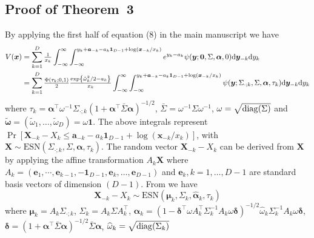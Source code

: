 \documentclass[lineno]{biometrika}
\begin{document}
\subsection{Proof of Theorem~3}

By applying the first half of equation (8) in the main manuscript we have
\begin{align}
\label{eq:V_skBR1}
V(\bm x) &= 
\sum_{k=1}^D {\textstyle{1\over x_k}} \int_{-\infty}^\infty \int_{-\infty}^{y_k+\bm a_{-k}-a_k\bm 1_{D-1}+\log(\bm x_{-k}/x_k)} e^{y_k-a_k} \psi(\bm y;\bm 0, \Sigma,\bm \alpha, 0) \text d \bm y_{-k} \text d y_k \nonumber \\
&= \sum_{k=1}^D {\textstyle{\Phi\left(\tau_k; 0, 1\right)\over2}} {\textstyle{\exp \left\{\tilde{\omega}_k^2/2-a_k\right\}\over x_k}} \int_{-\infty}^\infty\int_{-\infty}^{y_k+ \bm a_{-k}-a_k\bm 1_{D-1}+\log(\bm x_{-k}/x_k)}
\psi(\bm y;\Sigma_{\cdot;k}, \Sigma, \bm \alpha, \tau_k)\text d \bm y_{-k} \text d y_k
\end{align}
where $\tau_k=\bm \alpha^\top\omega^{-1}\Sigma_{\cdot;k} \left(1+\bm\alpha^\top\bar\Sigma \bm\alpha \right)^{-1/2}$, $\bar{\Sigma} = \omega^{-1} \Sigma \omega^{-1}$, $\omega = \sqrt{{\rm diag}(\Sigma)}$ and $\tilde{\bm \omega} = \left( \tilde{\omega}_1, \ldots, \tilde{ \omega}_D\right) = \omega \bm 1$. The above integrals represent $\Pr[\bm X_{-k}-X_k\leq \bm a_{-k}-a_{k}\bm 1_{D-1}+\log(\bm x_{-k}/x_k)]$, with $\bm X \sim \text{ESN}(\Sigma_{\cdot;k},\Sigma,\bm \alpha, \tau_k)$. The random vector $\bm X_{-k}-X_k$ can be derived from $\bm X$ by applying the affine transformation $A_k \bm X$ where $A_k = (\bm e_1,\cdots,\bm e_{k-1},-\bm 1_{D-1},\bm e_{k},\ldots,\bm e_{D-1})$ and $\bm e_k, k=1, \ldots, D-1$ are standard basis vectors of dimension $(D-1)$. From \citet[Chapter~5]{Azzalini:2013} we have 
%
$$
\bm X_{-k}-X_k \sim \text{ESN} \left( \bm \mu_k, \Sigma_k, \hat{\bm \alpha}_k, \tau_k\right)
$$
%
where $\bm \mu_k = A_k\Sigma_{\cdot;k}$, 
$\Sigma_k = A_k\Sigma A_k^\top$, 
$\hat{\bm \alpha}_k = (1-\bm\delta^\top \omega A_k^\top\Sigma_k^{-1}A_k\omega\bm\delta)^{-1/2} \hat \omega_k \Sigma_k^{-1}A_k\omega\bm\delta$, 
$\bm \delta = \left( 1 + \bm \alpha^\top \bar{\Sigma} \bm \alpha\right)^{-1/2}\bar{\Sigma} \bm \alpha$, 
${\widehat{\omega}}_k = \sqrt{{\rm diag}(\Sigma_k)}$
\end{document}
